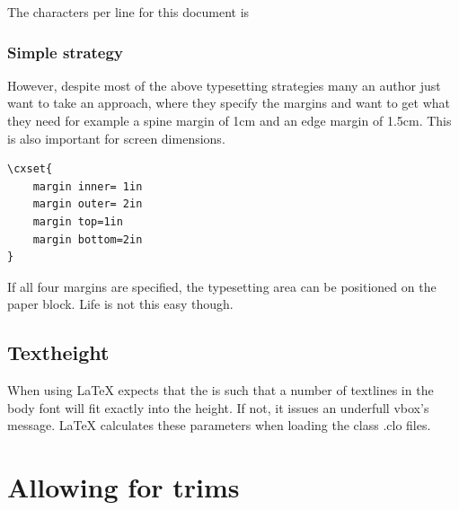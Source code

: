 The characters per line for this document is \charactersperline

\subsubsection{Simple strategy}
However, despite most of the above typesetting strategies many an author just want to take an approach, where they specify the margins and want to get what they need for example a spine margin of 1cm and an edge margin of 1.5cm. This is also important for screen dimensions.

\begin{lstlisting}
\cxset{
    margin inner= 1in
    margin outer= 2in
    margin top=1in
    margin bottom=2in
}
\end{lstlisting}

If all four margins are specified, the typesetting area can be positioned on the paper block. Life is not this easy though.



\subsection{Textheight}

When using  LaTeX expects that the  is such that a number of textlines in the body font will fit exactly into the height. If not, it issues an underfull vbox's message. LaTeX calculates these parameters when loading the class .clo files.
 



\section{Allowing for trims}
\newpage

\reversemarginparfalse

